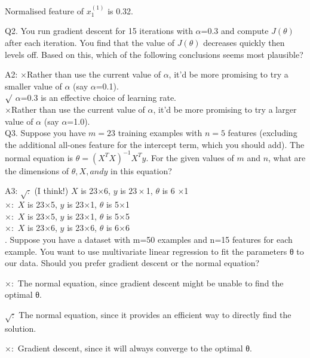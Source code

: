 \documentclass[11pt,a4paper]{article}
\begin{document}
Normalised feature of $x_1^{(1)}$ is 0.32.

\smallskip \smallskip
\noindent
Q2. You run gradient descent for 15 iterations with $\alpha$=0.3 and
compute $J(\theta)$ after each iteration. You find that the value of
$J(\theta)$ decreases quickly then levels off. Based on this, which of
the following conclusions seems most plausible?

A2:
$\times$Rather than use the current value of $\alpha$, it'd be more promising to try a smaller value of $\alpha$ (say $\alpha$=0.1).\\

$\surd$ $\alpha$=0.3 is an effective choice of learning rate.\\

$\times$Rather than use the current value of $\alpha$, it'd be more promising to try a larger value of $\alpha$ (say $\alpha$=1.0).\\

\smallskip \smallskip
\noindent
Q3. Suppose you have $m=23$ training examples with $n=5$ features
(excluding the additional all-ones feature for the intercept term,
which you should add). The normal equation is $\theta = (X^{T} X)^{-1}
X^{T} y$. For the given values of $m$ and $n$, what are the dimensions
of $θ, X, and y$ in this equation?

A3:
$\surd:$ (I think!) $X$ is 23$\times$6, $y$ is $23 \times$1, $\theta$ is 6 $\times$1\\

$\times:$ $X$ is 23$\times$5, $y$ is 23$\times$1, $\theta$ is 5$\times$1\\

$\times:$ $X$ is 23$\times$5, $y$ is 23$\times$1, $\theta$ is 5$\times$5\\

$\times:$ $X$ is 23$\times$6, $y$ is 23$\times$6, $\theta$ is 6$\times$6\\


\smallskip \smallskip
{}. Suppose you have a dataset with m=50 examples and n=15 features for each example. You want to use multivariate linear regression to fit the parameters θ to our data. Should you prefer gradient descent or the normal equation?

$\times:$ The normal equation, since gradient descent might be unable to find the optimal θ.

$\surd:$ The normal equation, since it provides an efficient way to directly find the solution.

$\times:$ Gradient descent, since it will always converge to the optimal θ.
\end{document}
